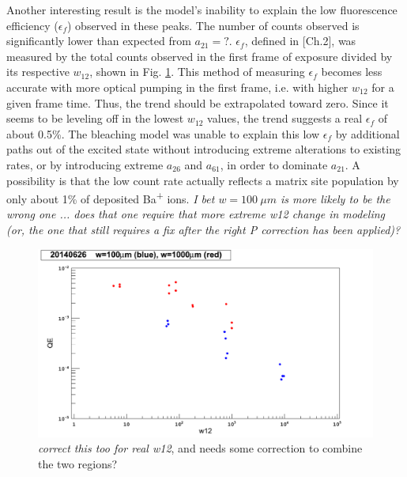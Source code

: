 Another interesting result is the model's inability to explain the low fluorescence efficiency ($\epsilon_{f}$) observed in these peaks.  The number of counts observed is significantly lower than expected from $a_{21} = ?$.  $\epsilon_{f}$, defined in [Ch.2], was measured by the total counts observed in the first frame of exposure divided by its respective $w_{12}$, shown in Fig. \ref{fig:qe}.  This method of measuring $\epsilon_{f}$ becomes less accurate with more optical pumping in the first frame, i.e. with higher $w_{12}$ for a given frame time.  Thus, the trend should be extrapolated toward zero.  Since it seems to be leveling off in the lowest $w_{12}$ values,  the trend suggests a real $\epsilon_{f}$ of about {\color{red}0.5\%}.  The bleaching model was unable to explain this low $\epsilon_{f}$ by additional paths out of the excited state without introducing extreme alterations to existing rates, or by introducing extreme $a_{26}$ and $a_{61}$, in order to dominate $a_{21}$.  A possibility is that the low count rate actually reflects a matrix site population by only about 1\% of deposited Ba\textsuperscript{+} ions.  \emph{\color{gray}I bet $w = 100~\mu m$ is more likely to be the wrong one ... does that one require that more extreme w12 change in modeling (or, the one that still requires a fix after the right P correction has been applied)?}

\begin{figure} %
        \centering
                \includegraphics[width=.7\textwidth]{figures/QE_20140626_separate_w.png}
                \caption{\emph{\color{gray}correct this too for real w12}, and needs some correction to combine the two regions?}
\label{fig:qe}
\end{figure}


